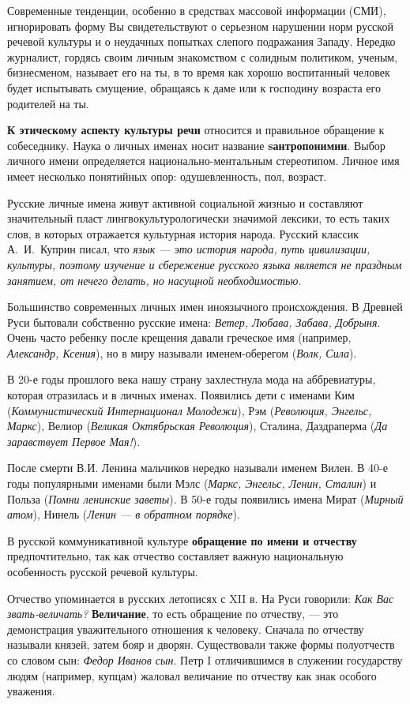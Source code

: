 Современные тенденции, особенно в средствах массовой информации (СМИ), игнорировать форму Вы свидетельствуют о серьезном нарушении норм русской речевой культуры и о неудачных попытках слепого подражания Западу. Нередко журналист,
гордясь своим личным знакомством с солидным политиком, ученым, бизнесменом, называет его на ты, в то время как хорошо воспитанный человек будет испытывать смущение, обращаясь к даме или к господину возраста его родителей на ты.

\textbf{К этическому аспекту культуры речи} относится и правильное обращение к собеседнику.
Наука о личных именах носит название \textbf{sантропонимии}.
Выбор личного имени определяется национально-ментальным стереотипом.
Личное имя имеет несколько
понятийных опор: одушевленность, пол, возраст.

Русские личные имена живут активной социальной жизнью и составляют значительный пласт лингвокультурологически значимой лексики, то есть таких слов, в которых отражается культурная история народа.
Русский классик А.~И.~Куприн писал, что \textit{язык --- это история народа, путь цивилизации, культуры, поэтому изучение и сбережение русского языка является не праздным занятием, от нечего делать, но насущной необходимостью.}

Большинство современных личных имен иноязычного происхождения.
В Древней Руси бытовали собственно русские имена:
\textit{Ветер, Любава, Забава, Добрыня}. Очень часто ребенку после крещения давали греческое имя (например,\textit{ Александр, Ксения}),
но в миру называли именем-оберегом (\textit{Волк, Сила}).

В 20-е годы прошлого века нашу страну захлестнула мода на аббревиатуры, которая отразилась и в личных именах.
Появились дети с именами Ким (\textit{Коммунистический Интернационал Молодежи}), Рэм (\textit{Революция, Энгельс, Маркс}), Велиор (\textit{Великая Октябрьская Революция}), Сталина, Даздраперма (\textit{Да заравствует Первое Мая!}).

После смерти В.И. Ленина мальчиков нередко называли именем Вилен.
В 40-е годы популярными именами были Мэлс (\textit{Маркс, Энгельс, Ленин, Сталин}) и Польза (\textit{Помни ленинские заветы}). В 50-е годы появились имена Мират (\textit{Мирный атом}), Нинель (\textit{Ленин --- в обратном порядке}).

В русской коммуникативной культуре \textbf{обращение по имени и отчеству} предпочтительно, так как отчество составляет важную национальную особенность русской речевой культуры.

Отчество упоминается в русских летописях с XII в. На Руси говорили:\textit{ Как Вас звать-величать?} {\bfseries Величание}, то есть обращение по отчеству, --- это демонстрация уважительного отношения к человеку.
Сначала по отчеству называли князей, затем бояр и дворян.
Существовали также формы полуотчеств со словом сын: \textit{Федор Иванов сын}.
Петр I отличившимся в служении государству людям (например, купцам) жаловал величание по отчеству как знак особого уважения.

